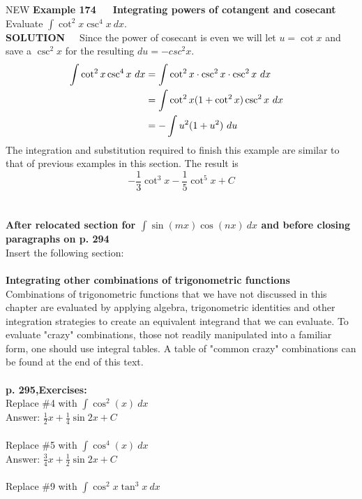 \documentclass[11pt]{report}
\begin{document}
NEW \textbf{Example 174~~~Integrating powers of cotangent and cosecant}\\
Evaluate $\int \cot^2 x \csc^4 x~dx.$  \\
\textbf{SOLUTION}~~~Since the power of cosecant is even we will let $u=\cot x$ and save a $\csc^2 x$ for the resulting $du=-csc^2 x$.
\begin{align}
\int \cot^2 x \csc^4 x~dx &= \int \cot^2 x \cdot \csc^2 x \cdot \csc^2 x~dx \cr
&=\int \cot^2 x (1 + \cot^2 x) \csc^2 x~dx \cr
&=- \int u^2 (1 + u^2) ~du \cr  
\end{align}
The integration and substitution required to finish this example are similar to that of previous examples in this section. The result is\\
$$-\frac{1}{3} \cot^3 x - \frac{1}{5} \cot^5 x + C$$
\\ \\

\textbf{After relocated section for $\int \sin (mx) \cos (nx)~dx$ and before closing paragraphs on p. 294}\\
Insert the following section:\\ \\
\textbf{Integrating other combinations of trigonometric functions}\\
Combinations of trigonometric functions that we have not discussed in this chapter are evaluated by applying algebra, trigonometric identities and other integration strategies to create an equivalent integrand that we can evaluate. To evaluate "crazy" combinations, those not readily manipulated into a familiar form, one should use integral tables. A table of "common crazy" combinations can be found at the end of this text. \\ \\   


\textbf{p. 295,Exercises:}\\
Replace \#4 with $\int \cos^2 (x)~dx$\\

Answer: $\frac{1}{2}x + \frac{1}{4}\sin 2x + C$\\ \\

Replace \#5 with $\int \cos^4 (x)~dx$\\

Answer: $\frac{3}{4}x + \frac{1}{2}\sin 2x + C$\\ \\

Replace \#9 with $\int \cos^2 x \tan^3 x~dx$\\
\end{document}
